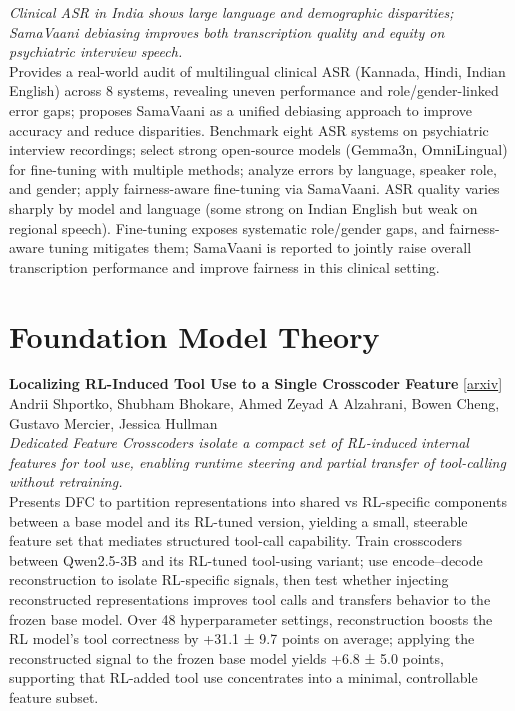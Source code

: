 \documentclass[12pt,letterpaper]{article}
\begin{document}
{\small\textit{Clinical ASR in India shows large language and demographic disparities; SamaVaani debiasing improves both transcription quality and equity on psychiatric interview speech.}}\\[1pt]
{\footnotesize Provides a real-world audit of multilingual clinical ASR (Kannada, Hindi, Indian English) across 8 systems, revealing uneven performance and role/gender-linked error gaps; proposes SamaVaani as a unified debiasing approach to improve accuracy and reduce disparities. Benchmark eight ASR systems on psychiatric interview recordings; select strong open-source models (Gemma3n, OmniLingual) for fine-tuning with multiple methods; analyze errors by language, speaker role, and gender; apply fairness-aware fine-tuning via SamaVaani. ASR quality varies sharply by model and language (some strong on Indian English but weak on regional speech). Fine-tuning exposes systematic role/gender gaps, and fairness-aware tuning mitigates them; SamaVaani is reported to jointly raise overall transcription performance and improve fairness in this clinical setting.}

\medskip


\section*{Foundation Model Theory}

{\small\textbf{Localizing RL-Induced Tool Use to a Single Crosscoder Feature}} {\scriptsize[\href{https://arxiv.org/abs/2606.26474}{arxiv}]}\\
{\scriptsize Andrii Shportko, Shubham Bhokare, Ahmed Zeyad A Alzahrani, Bowen Cheng, Gustavo Mercier, Jessica Hullman}\\

{\small\textit{Dedicated Feature Crosscoders isolate a compact set of RL-induced internal features for tool use, enabling runtime steering and partial transfer of tool-calling without retraining.}}\\[1pt]
{\footnotesize Presents DFC to partition representations into shared vs RL-specific components between a base model and its RL-tuned version, yielding a small, steerable feature set that mediates structured tool-call capability. Train crosscoders between Qwen2.5-3B and its RL-tuned tool-using variant; use encode--decode reconstruction to isolate RL-specific signals, then test whether injecting reconstructed representations improves tool calls and transfers behavior to the frozen base model. Over 48 hyperparameter settings, reconstruction boosts the RL model's tool correctness by +31.1 ± 9.7 points on average; applying the reconstructed signal to the frozen base model yields +6.8 ± 5.0 points, supporting that RL-added tool use concentrates into a minimal, controllable feature subset.}
\end{document}
